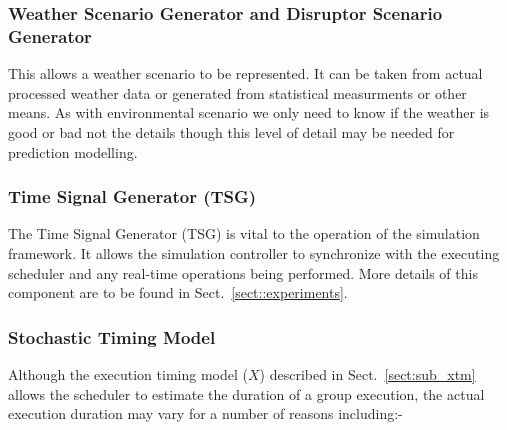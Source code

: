 \subsubsection{Weather Scenario Generator and Disruptor Scenario Generator}
\label{sect:sub_wsg}
This allows a weather scenario to be represented. It can be taken from actual processed weather data or generated from statistical measurments or other means. As with environmental scenario we only need to know if the weather is good or bad not the details though this level of detail may be needed for prediction modelling.

\subsubsection{Time Signal Generator (TSG)}
\label{sect:sub_tsg}
The Time Signal Generator (TSG) is vital to the operation of the simulation framework. It allows the simulation controller to synchronize with the executing scheduler and any real-time operations being performed. More details of this component are to be found in Sect.~\ref{sect::experiments}.

\subsubsection{Stochastic Timing Model}
Although the execution timing model ($X$) described in Sect.~\ref{sect:sub_xtm} allows the scheduler to estimate the duration of a group execution, the actual execution duration may vary for a number of reasons including:-

